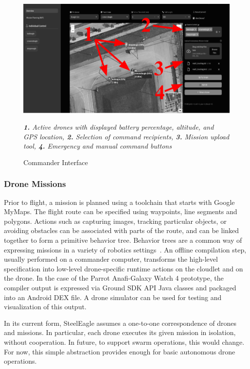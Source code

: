 \begin{figure}
    \centering
    \includegraphics[width=1.0\linewidth]{chapter4/FIGS/commander.png}
    \begin{captext}
    \small \textit{\textbf{1.} Active drones with displayed battery percentage, altitude, and GPS location, \textbf{2.} Selection of command recipients, \textbf{3.} Mission upload tool, \textbf{4.} Emergency and manual command buttons}
    \end{captext}
    \caption{Commander Interface}
    \label{fig:commander}
\end{figure}

\subsubsection{Drone Missions}
Prior to flight, a mission is planned using a toolchain that starts with Google MyMaps. The flight route can be specified using waypoints, line segments and polygons. Actions such as capturing images, tracking particular objects, or avoiding obstacles can be associated with parts of the route, and can be linked together to form a primitive behavior tree. Behavior trees are a common way of expressing missions in a variety of robotics settings~\cite{Ghouzli2023}. An offline compilation step, usually performed on a commander computer, transforms the high-level specification into low-level drone-specific runtime actions on the cloudlet and on the drone.  In the case of the Parrot Anafi-Galaxy Watch 4 prototype, the compiler output is expressed via Ground SDK API Java classes and packaged into an Android DEX file. A drone simulator can be used for testing and visualization of this output. 

In its current form, SteelEagle assumes a one-to-one correspondence of drones and missions. In particular, each drone executes its given mission in isolation, without cooperation. In future, to support swarm operations, this would change. For now, this simple abstraction provides enough for basic autonomous drone operations.

